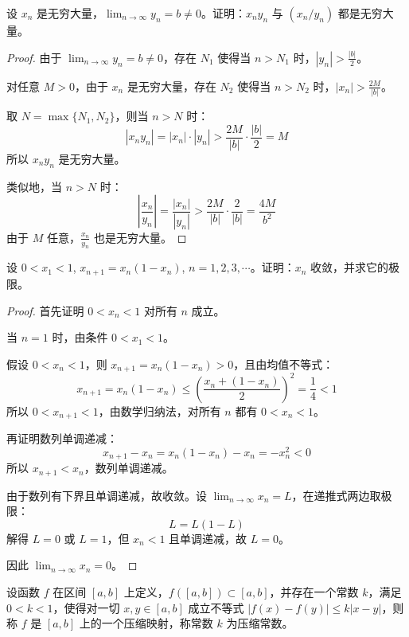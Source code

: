 \documentclass[lang=cn,12pt]{elegantbook}
\begin{document}
\begin{example}
设 $x_n$ 是无穷大量，$\lim_{n \to \infty} y_n = b \neq 0$。证明：$x_n y_n$ 与 $(x_n/y_n)$ 都是无穷大量。
\end{example}

\begin{proof}
由于 $\lim_{n \to \infty} y_n = b \neq 0$，存在 $N_1$ 使得当 $n > N_1$ 时，$|y_n| > \frac{|b|}{2}$。

对任意 $M > 0$，由于 $x_n$ 是无穷大量，存在 $N_2$ 使得当 $n > N_2$ 时，$|x_n| > \frac{2M}{|b|}$。

取 $N = \max\{N_1, N_2\}$，则当 $n > N$ 时：
\[
|x_n y_n| = |x_n| \cdot |y_n| > \frac{2M}{|b|} \cdot \frac{|b|}{2} = M
\]
所以 $x_n y_n$ 是无穷大量。

类似地，当 $n > N$ 时：
\[
\left|\frac{x_n}{y_n}\right| = \frac{|x_n|}{|y_n|} > \frac{2M}{|b|} \cdot \frac{2}{|b|} = \frac{4M}{b^2}
\]
由于 $M$ 任意，$\frac{x_n}{y_n}$ 也是无穷大量。
\end{proof}

\begin{example}
设 $0 < x_1 < 1$, $x_{n+1} = x_n(1-x_n)$, $n=1,2,3,\cdots$。证明：$x_n$ 收敛，并求它的极限。
\end{example}

\begin{proof}
首先证明 $0 < x_n < 1$ 对所有 $n$ 成立。

当 $n=1$ 时，由条件 $0 < x_1 < 1$。

假设 $0 < x_n < 1$，则 $x_{n+1} = x_n(1-x_n) > 0$，且由均值不等式：
\[
x_{n+1} = x_n(1-x_n) \leq \left(\frac{x_n + (1-x_n)}{2}\right)^2 = \frac{1}{4} < 1
\]
所以 $0 < x_{n+1} < 1$，由数学归纳法，对所有 $n$ 都有 $0 < x_n < 1$。

再证明数列单调递减：
\[
x_{n+1} - x_n = x_n(1-x_n) - x_n = -x_n^2 < 0
\]
所以 $x_{n+1} < x_n$，数列单调递减。

由于数列有下界且单调递减，故收敛。设 $\lim_{n \to \infty} x_n = L$，在递推式两边取极限：
\[
L = L(1-L)
\]
解得 $L = 0$ 或 $L = 1$，但 $x_n < 1$ 且单调递减，故 $L = 0$。

因此 $\lim_{n \to \infty} x_n = 0$。
\end{proof}

\begin{definition}[压缩映射]
设函数 \( f \) 在区间 \([a, b]\) 上定义，\( f([a, b]) \subset [a, b] \)，并存在一个常数 \( k \)，满足 \( 0 < k < 1 \)，使得对一切 \( x, y \in [a, b] \) 成立不等式 \( |f(x) - f(y)| \leq k|x - y| \)，则称 \( f \) 是 \([a, b]\) 上的一个压缩映射，称常数 \( k \) 为压缩常数。
\end{definition}
\end{document}
